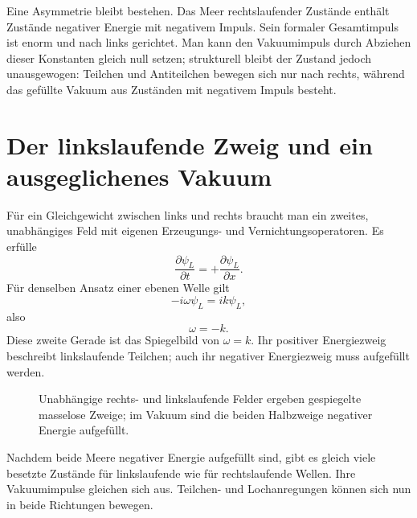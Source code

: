 Eine Asymmetrie bleibt bestehen. Das Meer rechtslaufender Zustände enthält Zustände negativer Energie mit negativem Impuls. Sein formaler Gesamtimpuls ist enorm und nach links gerichtet. Man kann den Vakuumimpuls durch Abziehen dieser Konstanten gleich null setzen; strukturell bleibt der Zustand jedoch unausgewogen: Teilchen und Antiteilchen bewegen sich nur nach rechts, während das gefüllte Vakuum aus Zuständen mit negativem Impuls besteht.

\section{Der linkslaufende Zweig und ein ausgeglichenes Vakuum}

Für ein Gleichgewicht zwischen links und rechts braucht man ein zweites, unabhängiges Feld mit eigenen Erzeugungs- und Vernichtungsoperatoren. Es erfülle
\begin{equation}
\frac{\partial\psi_L}{\partial t}
=
+\frac{\partial\psi_L}{\partial x}.
\end{equation}
Für denselben Ansatz einer ebenen Welle gilt
\begin{equation}
-i\omega\psi_L=ik\psi_L,
\end{equation}
also
\begin{equation}
\omega=-k.
\end{equation}
Diese zweite Gerade ist das Spiegelbild von \(\omega=k\). Ihr positiver Energiezweig beschreibt linkslaufende Teilchen; auch ihr negativer Energiezweig muss aufgefüllt werden.

\begin{figure}[htbp]
\centering
{}
\caption{Unabhängige rechts- und linkslaufende Felder ergeben gespiegelte masselose Zweige; im Vakuum sind die beiden Halbzweige negativer Energie aufgefüllt.}
\end{figure}

Nachdem beide Meere negativer Energie aufgefüllt sind, gibt es gleich viele besetzte Zustände für linkslaufende wie für rechtslaufende Wellen. Ihre Vakuumimpulse gleichen sich aus. Teilchen- und Lochanregungen können sich nun in beide Richtungen bewegen.

